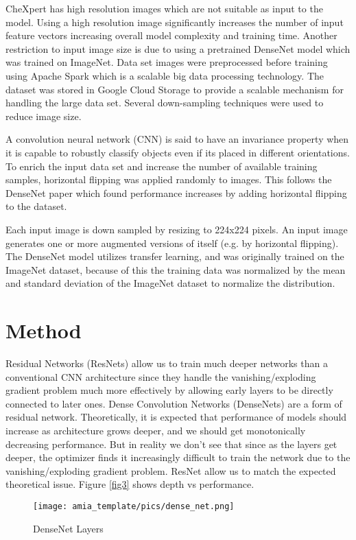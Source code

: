 \documentclass{amia}
\begin{document}
CheXpert\cite{ref2} has high resolution images which are not suitable as input to the model. Using a high resolution image significantly increases the number of input feature vectors increasing overall model complexity and training time. Another restriction to input image size is due to using a pretrained DenseNet model which was trained on ImageNet. Data set images were preprocessed before training using Apache Spark which is a scalable big data processing technology. The dataset was stored in Google Cloud Storage to provide a scalable mechanism for handling the large data set. Several down-sampling techniques were used to reduce image size.

A convolution neural network (CNN) is said to have an invariance property when it is capable to robustly classify objects even if its placed in different orientations. To enrich the input data set and increase the number of available training samples, horizontal flipping was applied randomly to images. This follows the DenseNet paper which found performance increases by adding horizontal flipping to the dataset.

Each input image is down sampled by resizing to 224x224 pixels. An input image generates one or more augmented versions of itself (e.g. by horizontal flipping). The DenseNet model utilizes transfer learning, and was originally trained on the ImageNet dataset, because of this the training data was normalized by the mean and standard deviation of the ImageNet dataset to normalize the distribution.

\section*{Method}
Residual Networks (ResNets) allow us to train much deeper networks than a conventional CNN architecture since they handle the vanishing/exploding gradient problem much more effectively by allowing early layers to be directly connected to later ones. Dense Convolution Networks (DenseNets) are a form of residual network. Theoretically, it is expected that performance of models should increase as architecture grows deeper, and we should get monotonically decreasing performance. But in reality we don't see that since as the layers get deeper, the optimizer finds it increasingly difficult to train the network due to the vanishing/exploding gradient problem. ResNet allow us to match the expected theoretical issue. Figure \ref{fig3} shows depth vs performance.

\begin{figure}[h!]
\centering
\texttt{[image: amia\_template/pics/dense\_net.png]}
\caption{DenseNet Layers}
\label{figx}
\end{figure}
\end{document}
